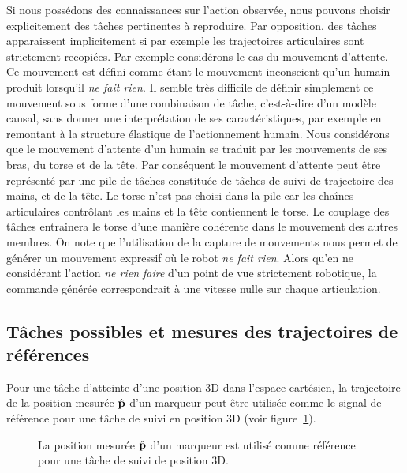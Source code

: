 Si nous possédons des connaissances sur l'action observée, nous pouvons choisir
explicitement des t\^aches pertinentes à reproduire. Par opposition, des t\^aches apparaissent
implicitement si par exemple les trajectoires articulaires sont strictement recopiées.
Par exemple considérons le cas du mouvement
d'attente. Ce mouvement est défini comme étant 
le mouvement inconscient qu'un humain produit
lorsqu'il \emph{ne fait rien}.
Il semble très difficile
de définir simplement ce mouvement sous forme d'une combinaison de t\^ache,
c'est-à-dire d'un modèle causal,
sans donner une interprétation de ses caractéristiques, par exemple en remontant
à la structure élastique de l'actionnement humain.
Nous considérons que le mouvement d'attente d'un humain se traduit
par les mouvements de ses bras, du torse et de la tête.
Par conséquent le mouvement d'attente peut être représenté par une pile de
t\^aches constituée de t\^aches de suivi de trajectoire des mains, et de la t\^ete.
Le torse n'est pas choisi dans la pile car les chaînes articulaires
contrôlant les mains et la t\^ete contiennent le torse.
Le couplage des t\^aches entrainera le torse d'une manière cohérente dans le mouvement 
des autres membres.
On note que l'utilisation de la capture de mouvements nous permet de générer 
un mouvement expressif où le robot \emph{ne fait rien}. Alors
qu'en ne considérant l'action \emph{ne rien faire} d'un point de vue 
strictement robotique, la commande générée correspondrait à une vitesse
nulle sur chaque articulation.

\subsection{T\^aches possibles et mesures des trajectoires de références}
Pour une t\^ache d'atteinte d'une position 3D dans l'espace cartésien,
la trajectoire de la position mesurée $\hat{{\mathbf{p}}}$ d'un marqueur peut être utilisée comme le
signal de référence pour une t\^ache de suivi en position 3D (voir figure~\ref{fig:handDemo}).
\begin{figure}[t]
  \begin{center}
    \resizebox{0.7\textwidth}{!}{
    
    }
  \end{center}
  \caption[T\^ache de suivi de trajectoire.]{La position mesurée $\hat{{\mathbf{p}}}$ d'un marqueur est utilisé comme
  référence pour une t\^ache de suivi de position 3D.}
  \label{fig:handDemo}
\end{figure}

